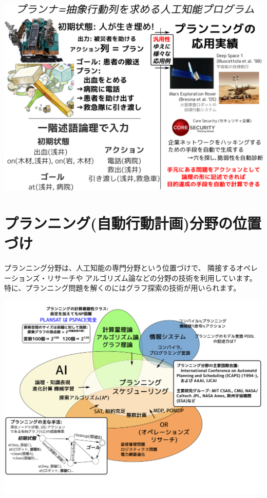 \includegraphics{img/planning.png}

\section{プランニング(自動行動計画)分野の位置づけ}
\label{sec-2}

\begin{resume}
プランニング分野は、人工知能の専門分野という位置づけで、
隣接するオペレーションズ・リサーチや
アルゴリズム論などの分野の技術を利用しています。
特に、プランニング問題を解くのにはグラフ探索の技術が用いられます。
\end{resume}

\includegraphics{img/planning2.png}


